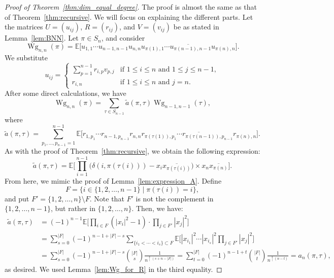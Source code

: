 \documentclass[10pt,a4paper]{amsart}
\numberwithin{equation}{section}
\theoremstyle{definition}
\DeclareMathOperator{\Wg}{Wg}
\begin{document}
\begin{proof}[Proof of Theorem~\ref{thm:dim_equal_degree}]
The proof is almost the same as that of Theorem~\ref{thm:recursive}.
We will focus on explaining the different parts.
Let the matrices $U=(u_{ij})$, $R=(r_{ij})$, and $V=(v_{ij})$ be as stated in Lemma~\ref{lem:BNN}.
Let $\pi \in S_n$, and consider
 \[
 \Wg_{n,n}(\pi) = \mathbb{E} \bigl[ u_{1,1} \cdots u_{n-1,n-1} u_{n,n}
 \overline{u_{\pi(1),1} \cdots u_{\pi(n-1),n-1} u_{\pi(n),n}} \bigr].
 \]
 We substitute
 \[
 u_{ij} =
 \begin{cases}
 \displaystyle \sum_{p=1}^{n-1} r_{i,p} v_{p,j} & \text{if $1 \le i \le n$ and $1 \le j \le n-1$}, \\
 r_{i,n} & \text{if $1 \le i \le n$ and $j=n$}.
 \end{cases}
 \]
 After some direct calculations, we have
 \[\Wg_{n,n}(\pi)= \sum_{\tau \in S_{n-1}} \tilde{a}(\pi,\tau) \Wg_{n-1,n-1}(\tau),
 \]
 where
 \[
 \tilde{a}(\pi,\tau)= \sum_{p_1,\dots,p_{n-1}=1}^{n-1} \mathbb{E}\bigl[ r_{1, p_1} \cdots r_{n-1, p_{n-1}} r_{n,n}
 \overline{r_{\pi (\tau(1)), p_1} \cdots r_{\pi (\tau(n-1)), p_{n-1}} r_{\pi(n),n}}
 \bigr].
 \]
 As with the proof of Theorem~\ref{thm:recursive}, we obtain the following expression:
 \[
 \tilde{a}(\pi,\tau)= \mathbb{E} \Biggl[\prod_{i=1}^{n-1}\bigl(\delta (i,\pi(\tau(i)))-x_{i} \overline{x_{\pi(\tau(i))}}\bigr) \times x_n \overline{x_{\pi(n)}} \Biggr].
 \]
 From here, we mimic the proof of Lemma~\ref{lem:expression_A}.
 Define
 \[
 F=\{i \in \{1,2,\dots,n-1\} \mid \pi(\tau(i))=i\},
 \]
 and put $F'=\{1,2,\dots,n\} \setminus F$.
 Note that $F'$ is not the complement in $\{1,2,\dots,n-1\}$, but rather in $\{1,2,\dots,n\}$.
 Then, we have:
 \begin{align*}
 \tilde{a}(\pi,\tau)
 &= (-1)^{n-1} \mathbb{E} \biggl[ \prod_{i \in F} (|x_i|^2-1) \cdot \prod_{j \in F'} |x_j|^2 \biggr] \\
 &= \sum_{s=0}^{|F|} (-1)^{n-1+|F|-s} \sum_{\{i_1< \cdots<i_s\} \subset F}
 \mathbb{E} \biggl[|x_{i_1}|^2 \cdots |x_{i_s}|^2 \prod_{j \in F'} |x_j|^2 \biggr] \\
 &= \sum_{s=0}^{|F|} (-1)^{n-1+|F|-s} \binom{|F|}{s} \frac{1}{n^{\uparrow (s+n-|F|)}} = \sum_{t=0}^{|F|} (-1)^{n-1+t} \binom{|F|}{t} \frac{1}{n^{\uparrow (n-t)}}
 =a_n(\pi, \tau),
 \end{align*}
 as desired. We used Lemma~\ref{lem:Wg_for_R} in the third equality.
\end{proof}
\end{document}
